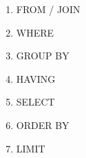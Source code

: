 \begin{infobox}
\begin{enumerate}
    \item FROM / JOIN
    \item WHERE
    \item GROUP BY
    \item HAVING
    \item SELECT
    \item ORDER BY
    \item LIMIT
\end{enumerate}
\end{infobox}
